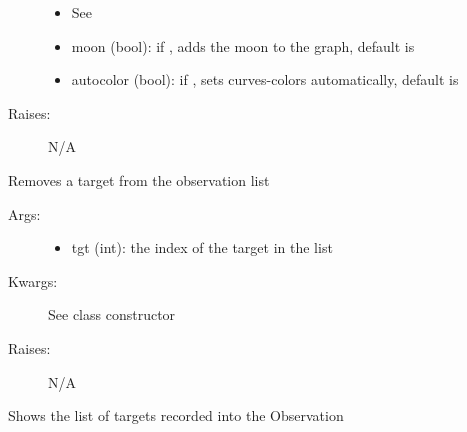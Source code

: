 \documentclass[letterpaper,10pt,english]{sphinxmanual}
\begin{document}
\begin{fulllineitems}
\begin{fulllineitems}
\begin{description}
\begin{itemize}
\item {} 
See 

\item {} 
moon (bool): if , adds the moon to the graph, default is 

\item {} 
autocolor (bool): if , sets curves-colors automatically, default is 

\end{itemize}

\item[{Raises:}] \leavevmode
N/A

\end{description}

\end{fulllineitems}


\begin{fulllineitems}
\label{astroobs:astroobs.Observation.Observation.rem_target}
Removes a target from the observation list
\begin{description}
\item[{Args:}] \leavevmode\begin{itemize}
\item {} 
tgt (int): the index of the target in the  list

\end{itemize}

\item[{Kwargs:}] \leavevmode
See class constructor

\item[{Raises:}] \leavevmode
N/A

\end{description}

\end{fulllineitems}


\begin{fulllineitems}
\label{astroobs:astroobs.Observation.Observation.targets}
Shows the list of targets recorded into the Observation

\end{fulllineitems}



\end{fulllineitems}
\end{document}

